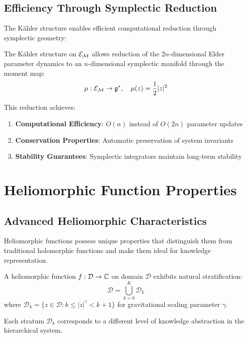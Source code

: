 \subsection{Efficiency Through Symplectic Reduction}

The Kähler structure enables efficient computational reduction through symplectic geometry:

\begin{theorem}
\label{thm:symplectic_efficiency}
The Kähler structure on $\mathcal{E}_{\mathcal{M}}$ allows reduction of the $2n$-dimensional Elder parameter dynamics to an $n$-dimensional symplectic manifold through the moment map:
\begin{equation}
\mu: \mathcal{E}_{\mathcal{M}} \rightarrow \mathfrak{g}^*, \quad \mu(z) = \frac{1}{2}|z|^2
\end{equation}

This reduction achieves:
\begin{enumerate}
    \item \textbf{Computational Efficiency}: $O(n)$ instead of $O(2n)$ parameter updates
    \item \textbf{Conservation Properties}: Automatic preservation of system invariants
    \item \textbf{Stability Guarantees}: Symplectic integrators maintain long-term stability
\end{enumerate}
\end{theorem}

\section{Heliomorphic Function Properties}

\subsection{Advanced Heliomorphic Characteristics}

Heliomorphic functions possess unique properties that distinguish them from traditional holomorphic functions and make them ideal for knowledge representation.

\begin{definition}
\label{def:heliomorphic_stratification}
A heliomorphic function $f: \mathcal{D} \rightarrow \mathbb{C}$ on domain $\mathcal{D}$ exhibits natural stratification:
\begin{equation}
\mathcal{D} = \bigcup_{k=0}^{K} \mathcal{D}_k
\end{equation}
where $\mathcal{D}_k = \{z \in \mathcal{D} : k \leq |z|^{\gamma} < k+1\}$ for gravitational scaling parameter $\gamma$.

Each stratum $\mathcal{D}_k$ corresponds to a different level of knowledge abstraction in the hierarchical system.
\end{definition}

